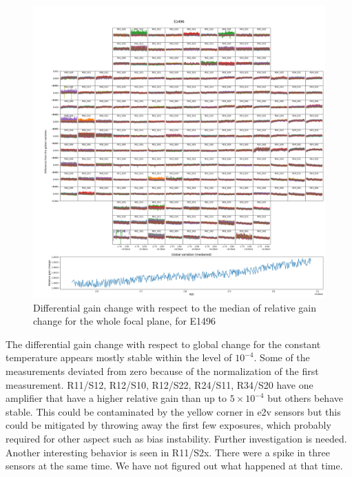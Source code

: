 \begin{figure}
    \centering
    \includegraphics[width=1\linewidth]{figures/gaintemp/E1496gainoverall_global.png}
    \caption{Differential gain change with respect to the median of relative gain change for the whole focal plane, for E1496}
    \label{fig:relative-gain-E1496}
\end{figure}
The differential gain change with respect to global change for the constant temperature appears mostly stable within the level of $10^{-4}$. Some of the measurements deviated from zero because of the normalization of the first measurement. R11/S12, R12/S10, R12/S22, R24/S11, R34/S20 have one amplifier that have a higher relative gain than up to $5\times 10^{-4}$ but others behave stable. This could be contaminated by the yellow corner in e2v sensors but this could be mitigated by throwing away the first few exposures, which probably required for other aspect such as bias instability. Further investigation is needed. Another interesting behavior is seen in R11/S2x. There were a spike in three sensors at the same time. We have not figured out what happened at that time.

